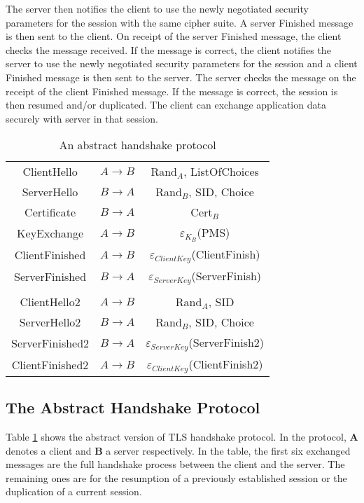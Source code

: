 \documentclass[a4paper,fleqn]{cas-dc}
\begin{document}
The server then notifies the client to use the newly negotiated security parameters for the session with the same cipher suite. A server Finished message is then sent to the client. On receipt of the server Finished message, the client checks the message received. If the message is correct, the client notifies the server to use the newly negotiated security parameters for the session and a client Finished message is then sent to the server. The server checks the message on the receipt of the client Finished message. If the message is correct, the session is then resumed and/or duplicated. The client can exchange application data securely with server in that session.

\begin{table}[]
\centering
 \caption{An abstract handshake protocol}
    \begin{tabular}{ c c c }
    ClientHello & $A \rightarrow B$  & Rand$_A$, ListOfChoices \\ 
    ServerHello & $B \rightarrow A$ & Rand$_B$, SID, Choice \\  
    Certificate & $B \rightarrow A$ & Cert$_B$ \\ 
    KeyExchange & $A \rightarrow B$ & $\varepsilon_{K_B}$(PMS) \\ 
    ClientFinished & $A \rightarrow B$ & $\varepsilon_{ClientKey}$(ClientFinish) \\
   ServerFinished & $B \rightarrow A$ & $\varepsilon_{ServerKey}$(ServerFinish) \\
   \\
   ClientHello2 & $A \rightarrow B$  & Rand$_A$, SID \\
   ServerHello2 & $B \rightarrow A$ & Rand$_B$, SID, Choice \\
   ServerFinished2 & $B \rightarrow A$ & $\varepsilon_{ServerKey}$(ServerFinish2) \\
   ClientFinished2 & $A \rightarrow B$ & $\varepsilon_{ClientKey}$(ClientFinish2) \\
    \end{tabular}
   
    \label{tab:tb2}
\end{table}

\subsection{The Abstract Handshake Protocol}\label{abstracthandshake}
Table \ref{tab:tb2} shows the abstract version of TLS handshake protocol. In the protocol, \textbf{A} denotes a client and \textbf{B} a server respectively. In the table, the first six exchanged messages are the full handshake process between the client and the server. The remaining ones are for the resumption of a previously established session or the duplication of a current session.
\end{document}
